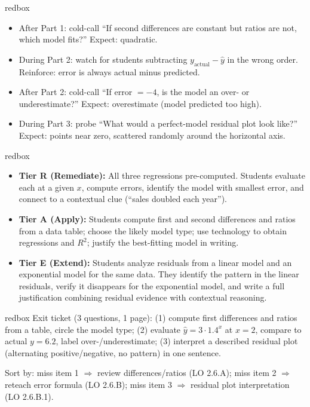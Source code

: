 \documentclass[10pt]{article}
\begin{document}
\begin{skillbox}{redbox}
\begin{itemize}[leftmargin=1.2em,itemsep=2pt,topsep=0pt]
  \item After Part 1: cold-call ``If second differences are constant but ratios are not,
        which model fits?'' Expect: quadratic.
  \item During Part 2: watch for students subtracting $y_{\text{actual}} - \hat{y}$ in the
        wrong order. Reinforce: error is always actual minus predicted.
  \item After Part 2: cold-call ``If error $= -4$, is the model an over- or underestimate?''
        Expect: overestimate (model predicted too high).
  \item During Part 3: probe ``What would a perfect-model residual plot look like?''
        Expect: points near zero, scattered randomly around the horizontal axis.
\end{itemize}
\end{skillbox}

\begin{skillbox}{redbox}
\begin{itemize}[leftmargin=1.2em,itemsep=2pt,topsep=0pt]
  \item \textbf{Tier R (Remediate):} All three regressions pre-computed. Students evaluate each
        at a given $x$, compute errors, identify the model with smallest error, and connect to a
        contextual clue (``sales doubled each year'').
  \item \textbf{Tier A (Apply):} Students compute first and second differences and ratios from
        a data table; choose the likely model type; use technology to obtain regressions and $R^2$;
        justify the best-fitting model in writing.
  \item \textbf{Tier E (Extend):} Students analyze residuals from a linear model and an exponential
        model for the same data. They identify the pattern in the linear residuals, verify it
        disappears for the exponential model, and write a full justification combining residual
        evidence with contextual reasoning.
\end{itemize}
\end{skillbox}

\begin{skillbox}{redbox}
Exit ticket (3 questions, 1 page): (1) compute first differences and ratios from a table, circle
the model type; (2) evaluate $\hat{y} = 3 \cdot 1.4^x$ at $x = 2$, compare to actual $y = 6.2$,
label over-/underestimate; (3) interpret a described residual plot (alternating positive/negative,
no pattern) in one sentence.

Sort by: miss item 1 $\Rightarrow$ review differences/ratios (LO 2.6.A);
miss item 2 $\Rightarrow$ reteach error formula (LO 2.6.B); miss item 3 $\Rightarrow$
residual plot interpretation (LO 2.6.B.1).
\end{skillbox}
\end{document}
